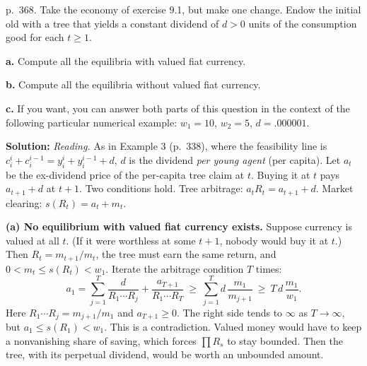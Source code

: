 \documentclass[12pt, letterpaper]{article}
\begin{document}
\begin{tcolorbox}[oddbox,title={Exercise 9.3 \quad A Lucas tree}]
\begin{tcolorbox}[questionbox]
p.~368. Take the economy of exercise 9.1, but make one change. Endow the initial old with a tree
that yields a constant dividend of $d>0$ units of the consumption good for each $t\ge1$.

\textbf{a.} Compute all the equilibria with valued fiat currency.

\textbf{b.} Compute all the equilibria without valued fiat currency.

\textbf{c.} If you want, you can answer both parts of this question in the context of the following
particular numerical example: $w_1=10$, $w_2=5$, $d=.000001$.
\end{tcolorbox}

\textbf{Solution:} \emph{Reading.} As in Example 3 (p.~338), where the feasibility line is
$c_i^i+c_i^{i-1}=y_i^i+y_i^{i-1}+d$, $d$ is the dividend \emph{per young agent} (per capita). Let
$a_t$ be the ex-dividend price of the per-capita tree claim at $t$. Buying it at $t$ pays
$a_{t+1}+d$ at $t+1$. Two conditions hold. Tree arbitrage: $a_tR_t=a_{t+1}+d$. Market clearing:
$s(R_t)=a_t+m_t$.

\textbf{(a) No equilibrium with valued fiat currency exists.} Suppose currency is valued at all $t$.
(If it were worthless at some $t+1$, nobody would buy it at $t$.) Then $R_t=m_{t+1}/m_t$, the tree
must earn the same return, and $0<m_t\le s(R_t)<w_1$. Iterate the arbitrage condition $T$ times:
\[
a_1=\sum_{j=1}^{T}\frac{d}{R_1\cdots R_j}+\frac{a_{T+1}}{R_1\cdots R_T}\ \ge\ \sum_{j=1}^{T}d\,\frac{m_1}{m_{j+1}}\ \ge\ T\,d\,\frac{m_1}{w_1}.
\]
Here $R_1\cdots R_j=m_{j+1}/m_1$ and $a_{T+1}\ge0$. The right side tends to $\infty$ as $T\to\infty$,
but $a_1\le s(R_1)<w_1$. This is a contradiction. Valued money would have to keep a nonvanishing
share of saving, which forces $\prod R_s$ to stay bounded. Then the tree, with its perpetual
dividend, would be worth an unbounded amount.


\end{tcolorbox}
\end{document}
